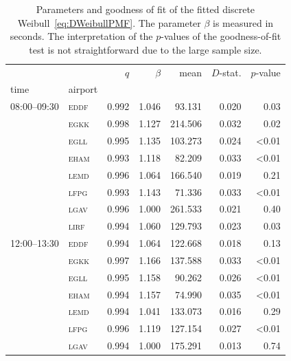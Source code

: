 \documentclass[draft,review]{elsarticle}
\newcommand{\airp}[1]{\textcolor{#1}{\textsc{#1}}}
\begin{document}
\begin{table}
    \centering
    \caption{Parameters and goodness of fit of the fitted discrete Weibull~\eqref{eq:DWeibullPMF}. The parameter \(\beta\) is measured in seconds. The interpretation of the \(p\)-values of the goodness-of-fit test is not straightforward due to the large sample size.}
    \label{tab:fitted}
    \begin{tabular}{llrrrrr}
      \toprule
                   &             &   \(q\) & \(\beta\) &    mean & \(D\)-stat. & \(p\)-value \\
      time & airport &       &         &         &           &           \\
      \midrule
      08:00--09:30 & \airp{eddf} & 0.992 &   1.046 &  93.131 &     0.020 &      0.03 \\
                   & \airp{egkk} & 0.998 &   1.127 & 214.506 &     0.032 &      0.02 \\
                   & \airp{egll} & 0.995 &   1.135 & 103.273 &     0.024 &     <0.01 \\
                   & \airp{eham} & 0.993 &   1.118 &  82.209 &     0.033 &     <0.01 \\
                   & \airp{lemd} & 0.996 &   1.064 & 166.540 &     0.019 &      0.21 \\
                   & \airp{lfpg} & 0.993 &   1.143 &  71.336 &     0.033 &     <0.01 \\
                   & \airp{lgav} & 0.996 &   1.000 & 261.533 &     0.021 &      0.40 \\
                   & \airp{lirf} & 0.994 &   1.060 & 129.793 &     0.023 &      0.03 \\
      12:00--13:30 & \airp{eddf} & 0.994 &   1.064 & 122.668 &     0.018 &      0.13 \\
                   & \airp{egkk} & 0.997 &   1.166 & 137.588 &     0.033 &     <0.01 \\
                   & \airp{egll} & 0.995 &   1.158 &  90.262 &     0.026 &     <0.01 \\
                   & \airp{eham} & 0.994 &   1.157 &  74.990 &     0.035 &     <0.01 \\
                   & \airp{lemd} & 0.994 &   1.041 & 133.073 &     0.016 &      0.29 \\
                   & \airp{lfpg} & 0.996 &   1.119 & 127.154 &     0.027 &     <0.01 \\
                   & \airp{lgav} & 0.994 &   1.000 & 175.291 &     0.013 &      0.74 \\

\end{tabular}
\end{table}
\end{document}
